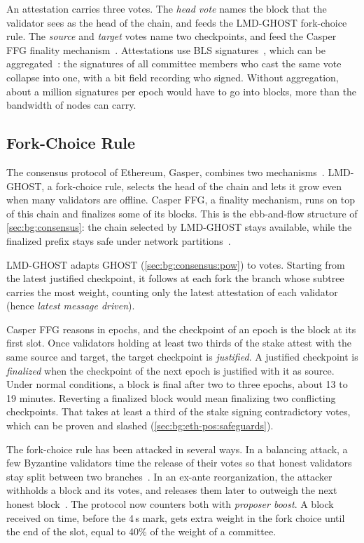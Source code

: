 An attestation carries three votes.
The \emph{head vote} names the block that the validator sees as the head of the chain, and feeds the LMD-GHOST fork-choice rule.
The \emph{source} and \emph{target} votes name two checkpoints, and feed the Casper FFG finality mechanism~\cite{schwarzschilling2022three}.
Attestations use BLS signatures~\cite{boneh2001short}, which can be aggregated~\cite{boneh2003aggregate}: the signatures of all committee members who cast the same vote collapse into one, with a bit field recording who signed.
Without aggregation, about a million signatures per epoch would have to go into blocks, more than the bandwidth of nodes can carry.

\subsection{Fork-Choice Rule}\label{sec:bg:eth-pos:forkchoice}

The consensus protocol of Ethereum, Gasper, combines two mechanisms~\cite{schwarzschilling2022three,neu2021ebb}.
LMD-GHOST, a fork-choice rule, selects the head of the chain and lets it grow even when many validators are offline.
Casper FFG, a finality mechanism, runs on top of this chain and finalizes some of its blocks.
This is the ebb-and-flow structure of \autoref{sec:bg:consensus}: the chain selected by LMD-GHOST stays available, while the finalized prefix stays safe under network partitions~\cite{neu2021ebb}.

LMD-GHOST adapts GHOST (\autoref{sec:bg:consensus:pow}) to votes.
Starting from the latest justified checkpoint, it follows at each fork the branch whose subtree carries the most weight, counting only the latest attestation of each validator (hence \emph{latest message driven}).

Casper FFG reasons in epochs, and the checkpoint of an epoch is the block at its first slot.
Once validators holding at least two thirds of the stake attest with the same source and target, the target checkpoint is \emph{justified}.
A justified checkpoint is \emph{finalized} when the checkpoint of the next epoch is justified with it as source.
Under normal conditions, a block is final after two to three epochs, about 13 to 19 minutes.
Reverting a finalized block would mean finalizing two conflicting checkpoints.
That takes at least a third of the stake signing contradictory votes, which can be proven and slashed (\autoref{sec:bg:eth-pos:safeguards}).

The fork-choice rule has been attacked in several ways.
In a balancing attack, a few Byzantine validators time the release of their votes so that honest validators stay split between two branches~\cite{neu2021ebb}.
In an ex-ante reorganization, the attacker withholds a block and its votes, and releases them later to outweigh the next honest block~\cite{schwarzschilling2022three}.
The protocol now counters both with \emph{proposer boost}.
A block received on time, before the 4\,s mark, gets extra weight in the fork choice until the end of the slot, equal to 40\% of the weight of a committee.

